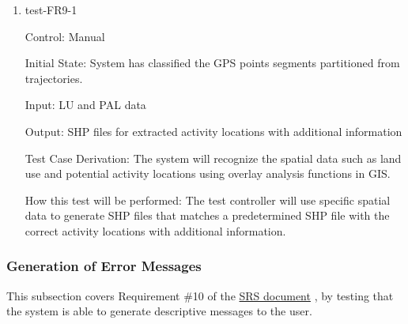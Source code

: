 \documentclass[12pt, titlepage]{article}
\begin{document}
\begin{enumerate}

\item{test-FR9-1\\} \label{test-FR9-1}

Control: Manual 
					
Initial State: System has classified the GPS points segments partitioned from trajectories.
					
Input: LU and PAL data
					
Output: SHP files for extracted activity locations with additional information 

Test Case Derivation: The system will recognize the spatial data such as land use and potential activity locations using overlay analysis functions in GIS.
					
How this test will be performed: The test controller will use specific spatial data to generate SHP files that matches a predetermined SHP file with the correct activity locations with additional information.

\end{enumerate}

\subsubsection{Generation of Error Messages}

This subsection covers Requirement \#10 of the \href{https://github.com/paezha/PyERT-BLACK/blob/main/docs/SRS/SRS.pdf}{SRS document} \citep{SRS}, by testing that the system is able to generate descriptive messages to the user.
\end{document}
